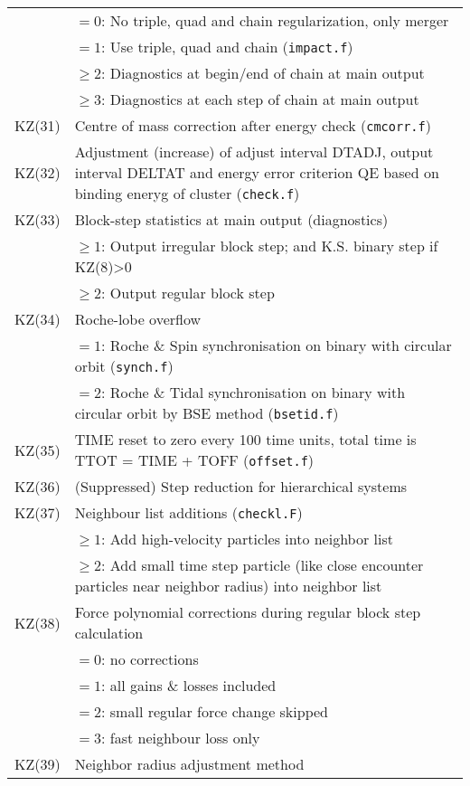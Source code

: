 \begin{longtable}{@{}p{1.5cm}p{13.0cm}}
        & $=0$: No triple, quad and chain regularization, only merger \\
        & $=1$: Use triple, quad and chain (\texttt{impact.f}) \\
        & $\ge 2$: Diagnostics at begin/end of chain at main output \\
        & $\ge 3$: Diagnostics at each step of chain at main output \\
KZ(31)  & Centre of mass correction after energy check (\texttt{cmcorr.f}) \\
KZ(32)  & Adjustment (increase) of adjust interval DTADJ, output interval DELTAT and energy error criterion QE based on binding eneryg of cluster (\texttt{check.f}) \\
KZ(33)  & Block-step statistics at main output (diagnostics) \\
        & $\ge 1$: Output irregular block step; and K.S. binary step if KZ(8)>0 \\
        & $\ge 2$: Output regular block step \\
KZ(34)  & Roche-lobe overflow \\
        & $=1$: Roche \& Spin synchronisation on binary with circular orbit (\texttt{synch.f}) \\
        & $=2$: Roche \& Tidal synchronisation on binary with circular orbit by BSE method (\texttt{bsetid.f}) \\
KZ(35)  & TIME reset to zero every 100 time units, total time is TTOT = TIME + TOFF (\texttt{offset.f})\\
KZ(36)  & (Suppressed) Step reduction for hierarchical systems \\
KZ(37)  & Neighbour list additions (\texttt{checkl.F}) \\
        & $\ge 1$: Add high-velocity particles into neighbor list \\
        & $\ge 2$: Add small time step particle (like close encounter particles near neighbor radius) into neighbor list \\
KZ(38)  & Force polynomial corrections during regular block step calculation \\
        & $=0$: no corrections \\
        & $=1$: all gains \& losses included \\
        & $=2$: small regular force change skipped \\
        & $=3$: fast neighbour loss only \\
KZ(39)  & Neighbor radius adjustment method \\

\end{longtable}
